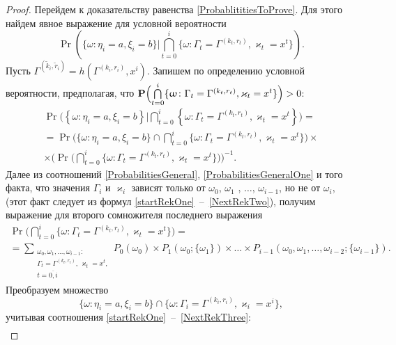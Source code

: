 \begin{proof}
Перейдем к доказательству равенства \eqref{ProbablititiesToProve}. Для этого найдем явное выражение для условной вероятности 
$$
\Pr (\{ \omega \colon \eta_i = a,  \xi_i=b\} | \bigcap_{t=0}^{i}\{\omega\colon \Gamma_t=\Gamma^{(k_t,  r_t)},   \varkappa_t=x^t\}).
$$
Пусть $\Gamma^{(\tilde{k}_i,  \tilde{r}_i)}=h(\Gamma^{(k_i,  r_i)},  x^i)$. Запишем по определению условной вероятности,   предполагая,   что $\Pr\Bigl(\bigcap\limits_{t=0}^{i}\{\omega\colon \Gamma_t=\Gamma^{(k_t,  r_t)},   \varkappa_t=x^t\}\Bigr)>0$:
\begin{multline}
\Pr \biggl(\left\{ \omega \colon \eta_i = a,   \xi_i=b\right\}  \bigg| \bigcap_{t=0}^{i}\left\{\omega\colon \Gamma_t=\Gamma^{(k_t,  r_t)},   \varkappa_t=x^t\right\}\biggr) = \\
=\Pr\biggl(\{ \omega \colon \eta_i = a,   \xi_i=b \} \cap \bigcap_{t=0}^{i}\{\omega\colon \Gamma_t=\Gamma^{(k_t,  r_t)},   \varkappa_t=x^t\}\biggr) \times \\
\times
\biggl(\Pr\biggl( \bigcap_{t=0}^{i}\{\omega\colon \Gamma_t=\Gamma^{(k_t,  r_t)},   \varkappa_t=x^t\}\biggr)\biggr)^{-1}.
\label{Construction:1}
\end{multline}
Далее из соотношений \eqref{ProbabilitiesGeneral},   \eqref{ProbabilitiesGeneralOne} и того факта,   что значения $\Gamma_i$ и $\varkappa_{i}$ зависят только от $\omega_0$,  $\omega_1$ ,  $\ldots$,  $\omega_{i-1}$,   но не от $\omega_i$,   (этот факт следует из формул \eqref{startRekOne}~--~\eqref{NextRekTwo}),   получим выражение для второго сомножителя последнего выражения
\begin{multline}
\Pr\biggl( \bigcap_{t=0}^{i}\{\omega\colon \Gamma_t=\Gamma^{(k_t,  r_t)},   \varkappa_t=x^t\}\biggr)=\\
=\sum_{\substack{\omega_0,   \omega_1,  \ldots,   \omega_{i-1} \colon \\ \Gamma_t=\Gamma^{(k_t,  r_t)},  \,   \varkappa_t=x^t,  \\ t=\overline{0,  i}}} P_0(\omega_0)\times P_1(\omega_0;\{\omega_1\})\times\ldots\times P_{i-1}(\omega_0,  \omega_1,  \ldots,   \omega_{i-2};\{\omega_{i-1}\}).
\label{Construction:2}
\end{multline}
Преобразуем множество 
$$
\{\omega\colon \eta_i = a,   \xi_i=b \} \cap \{\omega\colon\Gamma_i=\Gamma^{(k_i,  r_i)},   \varkappa_i=x^i\},
$$
учитывая соотношения \eqref{startRekOne}~--~\eqref{NextRekThree}:
\begin{multline*}

\end{multline*}
\end{proof}
